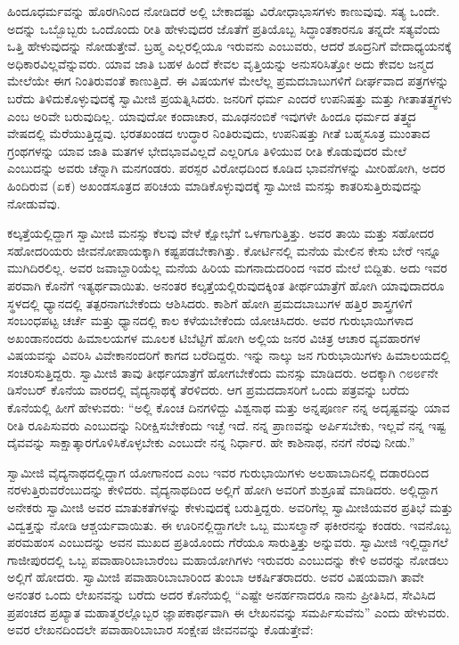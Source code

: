  ಹಿಂದೂಧರ್ಮವನ್ನು ಹೊರಗಿನಿಂದ ನೋಡಿದರೆ ಅಲ್ಲಿ ಬೇಕಾದಷ್ಟು ವಿರೋಧಾಭಾಸಗಳು ಕಾಣುವುವು. ಸತ್ಯ ಒಂದೇ. ಅದನ್ನು ಒಬ್ಬೊಬ್ಬರು ಒಂದೊಂದು ರೀತಿ ಹೇಳುವುದರ ಜೊತೆಗೆ ಪ್ರತಿಯೊಬ್ಬ ಸಿದ್ಧಾಂತಕಾರನೂ ತನ್ನದೇ ಸತ್ಯವೆಂದು ಒತ್ತಿ ಹೇಳುವುದನ್ನು ನೋಡುತ್ತೇವೆ. ಬ್ರಹ್ಮ ಎಲ್ಲರಲ್ಲಿಯೂ ಇರುವನು ಎಂಬುವರು, ಆದರೆ ಶೂದ್ರನಿಗೆ ವೇದಾಧ್ಯಯನಕ್ಕೆ ಅಧಿಕಾರವಿಲ್ಲವೆನ್ನುವರು. ಯಾವ ಜಾತಿ ಬಹಳ ಹಿಂದೆ ಕೇವಲ ವೃತ್ತಿಯನ್ನು ಅನುಸರಿಸಿತ್ತೋ ಅದು ಕೇವಲ ಜನ್ಮದ ಮೇಲೆಯೇ ಈಗ ನಿಂತಿರುವಂತೆ ಕಾಣುತ್ತಿದೆ. ಈ ವಿಷಯಗಳ ಮೇಲೆಲ್ಲ ಪ್ರಮದಬಾಬುಗಳಿಗೆ ದೀರ್ಘವಾದ ಪತ್ರಗಳನ್ನು ಬರೆದು ತಿಳಿದುಕೊಳ್ಳುವುದಕ್ಕೆ ಸ್ವಾಮೀಜಿ ಪ್ರಯತ್ನಿಸಿದರು. ಜನರಿಗೆ ಧರ್ಮ ಎಂದರೆ ಉಪನಿಷತ್ತು ಮತ್ತು ಗೀತಾತತ್ತ್ವಗಳು ಎಂಬ ಅರಿವೇ ಬರುವುದಿಲ್ಲ. ಯಾವುದೋ ಕಂದಾಚಾರ, ಮೂಢನಂಬಿಕೆ ಇವುಗಳೇ ಹಿಂದೂ ಧರ್ಮದ ತತ್ತ್ವದ ವೇಷದಲ್ಲಿ ಮೆರೆಯುತ್ತಿದ್ದವು. ಭರತಖಂಡದ ಉದ್ಧಾರ ನಿಂತಿರುವುದು, ಉಪನಿಷತ್ತು ಗೀತೆ ಬಹ್ಮಸೂತ್ರ ಮುಂತಾದ ಗ್ರಂಥಗಳನ್ನು ಯಾವ ಜಾತಿ ಮತಗಳ ಭೇದಭಾವವಿಲ್ಲದೆ ಎಲ್ಲರಿಗೂ ತಿಳಿಯುವ ರೀತಿ ಕೊಡುವುದರ ಮೇಲೆ ಎಂಬುದನ್ನು ಅವರು ಚೆನ್ನಾಗಿ ಮನಗಂಡರು. ಪರಸ್ಪರ ವಿರೋಧದಿಂದ ಕೂಡಿದ ಭಾವನೆಗಳನ್ನು ಮೀರಿಹೋಗಿ, ಅದರ ಹಿಂದಿರುವ (ಏಕ) ಅಖಂಡಸೂತ್ರದ ಪರಿಚಯ ಮಾಡಿಕೊಳ್ಳುವುದಕ್ಕೆ ಸ್ವಾಮೀಜಿ ಮನಸ್ಸು ಕಾತರಿಸುತ್ತಿರುವುದನ್ನು ನೋಡುವೆವು. 

 ಕಲ್ಕತ್ತೆಯಲ್ಲಿದ್ದಾಗ ಸ್ವಾಮೀಜಿ ಮನಸ್ಸು ಕೆಲವು ವೇಳೆ ಕ್ಷೋಭೆಗೆ ಒಳಗಾಗುತ್ತಿತ್ತು. ಅವರ ತಾಯಿ ಮತ್ತು ಸಹೋದರ ಸಹೋದರಿಯರು ಜೀವನೋಪಾಯಕ್ಕಾಗಿ ಕಷ್ಟಪಡಬೇಕಾಗಿತ್ತು. ಕೋರ್ಟಿನಲ್ಲಿ ಮನೆಯ ಮೇಲಿನ ಕೇಸು ಬೇರೆ ಇನ್ನೂ ಮುಗಿದಿರಲಿಲ್ಲ. ಅವರ ಜವಾಬ್ದಾರಿಯೆಲ್ಲ ಮನೆಯ ಹಿರಿಯ ಮಗನಾದುದರಿಂದ ಇವರ ಮೇಲೆ ಬಿದ್ದಿತು. ಅದು ಇವರ ಪರವಾಗಿ ಕೊನೆಗೆ ಇತ್ಯರ್ಥವಾಯಿತು. ಅನಂತರ ಕಲ್ಕತ್ತೆಯಲ್ಲಿರುವುದಕ್ಕಿಂತ ತೀರ್ಥಯಾತ್ರೆಗೆ ಹೋಗಿ ಯಾವುದಾದರೂ ಸ್ಥಳದಲ್ಲಿ ಧ್ಯಾನದಲ್ಲಿ ತತ್ಪರನಾಗಬೇಕೆಂದು ಆಶಿಸಿದರು. ಕಾಶಿಗೆ ಹೋಗಿ ಪ್ರಮದಬಾಬುಗಳ ಹತ್ತಿರ ಶಾಸ್ತ್ರಗಳಿಗೆ ಸಂಬಂಧಪಟ್ಟ ಚರ್ಚೆ ಮತ್ತು ಧ್ಯಾನದಲ್ಲಿ ಕಾಲ ಕಳೆಯಬೇಕೆಂದು ಯೋಚಿಸಿದರು. ಅವರ ಗುರುಭಾಯಿಗಳಾದ ಅಖಂಡಾನಂದರು ಹಿಮಾಲಯಗಳ ಮೂಲಕ ಟಿಬೆಟ್ಟಿಗೆ ಹೋಗಿ ಅಲ್ಲಿಯ ಜನರ ವಿಚಿತ್ರ ಆಚಾರ ವ್ಯವಹಾರಗಳ ವಿಷಯವನ್ನು ವಿವರಿಸಿ ವಿವೇಕಾನಂದರಿಗೆ ಕಾಗದ ಬರೆದಿದ್ದರು. ಇನ್ನು ನಾಲ್ಕು ಜನ ಗುರುಭಾಯಿಗಳು ಹಿಮಾಲಯದಲ್ಲಿ ಸಂಚರಿಸುತ್ತಿದ್ದರು. ಸ್ವಾಮೀಜಿ ತಾವು ತೀರ್ಥಯಾತ್ರೆಗೆ ಹೋಗಬೇಕೆಂದು ಮನಸ್ಸು ಮಾಡಿದರು. ಅದಕ್ಕಾಗಿ ೧೮೮೯ನೇ ಡಿಸೆಂಬರ್ ಕೊನೆಯ ವಾರದಲ್ಲಿ ವೈದ್ಯನಾಥಕ್ಕೆ ತೆರಳಿದರು. ಆಗ ಪ್ರಮದದಾಸರಿಗೆ ಒಂದು ಪತ್ರವನ್ನು ಬರೆದು ಕೊನೆಯಲ್ಲಿ ಹೀಗೆ ಹೇಳುವರು: “ಅಲ್ಲಿ ಕೊಂಚ ದಿನಗಳಿದ್ದು ವಿಶ್ವನಾಥ ಮತ್ತು ಅನ್ನಪೂರ್ಣ ನನ್ನ ಅದೃಷ್ಟವನ್ನು ಯಾವ ರೀತಿ ರೂಪಿಸುವರು ಎಂಬುದನ್ನು ನಿರೀಕ್ಷಿಸಬೇಕೆಂದು ಇಚ್ಛೆ ಇದೆ. ನನ್ನ ಪ್ರಾಣವನ್ನು ಅರ್ಪಿಸಬೇಕು, ಇಲ್ಲವೆ ನನ್ನ ಇಷ್ಟ ದೈವವನ್ನು ಸಾಕ್ಷಾತ್ಕಾರಗೊಳಿಸಿಕೊಳ್ಳಬೇಕು ಎಂಬುದೇ ನನ್ನ ನಿರ್ಧಾರ. ಹೇ ಕಾಶಿನಾಥ, ನನಗೆ ನೆರವು ನೀಡು.” 

 ಸ್ವಾಮೀಜಿ ವೈದ್ಯನಾಥದಲ್ಲಿದ್ದಾಗ ಯೋಗಾನಂದ ಎಂಬ ಇವರ ಗುರುಭಾಯಿಗಳು ಅಲಹಾಬಾದಿನಲ್ಲಿ ದಡಾರದಿಂದ ನರಳುತ್ತಿರುವರೆಂಬುದನ್ನು ಕೇಳಿದರು. ವೈದ್ಯನಾಥದಿಂದ ಅಲ್ಲಿಗೆ ಹೋಗಿ ಅವರಿಗೆ ಶುಶ್ರೂಷೆ ಮಾಡಿದರು. ಅಲ್ಲಿದ್ದಾಗ ಅನೇಕರು ಸ್ವಾಮೀಜಿ ಅವರ ಮಾತುಕತೆಗಳನ್ನು ಕೇಳುವುದಕ್ಕೆ ಬರುತ್ತಿದ್ದರು. ಅವರಿಗೆಲ್ಲ ಸ್ವಾಮೀಜಿಯವರ ಪ್ರತಿಭೆ ಮತ್ತು ವಿದ್ವತ್ತನ್ನು ನೋಡಿ ಆಶ್ಚರ್ಯವಾಯಿತು. ಈ ಊರಿನಲ್ಲಿದ್ದಾಗಲೇ ಒಬ್ಬ ಮುಸಲ್ಮಾನ್ ಫಕೀರನನ್ನು ಕಂಡರು. ಇವನೊಬ್ಬ ಪರಮಹಂಸ ಎಂಬುದನ್ನು ಅವನ ಮುಖದ ಪ್ರತಿಯೊಂದು ಗೆರೆಯೂ ಸಾರುತ್ತಿತ್ತು ಅನ್ನುವರು. ಸ್ವಾಮೀಜಿ ಇಲ್ಲಿದ್ದಾಗಲೆ ಗಾಜೀಪುರದಲ್ಲಿ ಒಬ್ಬ ಪವಾಹಾರಿಬಾಬಾರೆಂಬ ಮಹಾಯೋಗಿಗಳು ಇರುವರು ಎಂಬುದನ್ನು ಕೇಳಿ ಅವರನ್ನು ನೋಡಲು ಅಲ್ಲಿಗೆ ಹೋದರು. ಸ್ವಾಮೀಜಿ ಪವಾಹಾರಿಬಾಬಾರಿಂದ ತುಂಬಾ ಆಕರ್ಷಿತರಾದರು. ಅವರ ವಿಷಯವಾಗಿ ತಾವೇ ಅನಂತರ ಒಂದು ಲೇಖನವನ್ನು ಬರೆದು ಅದರ ಕೊನೆಯಲ್ಲಿ “ಎಷ್ಟೇ ಅನರ್ಹನಾದರೂ ನಾನು ಪ್ರೀತಿಸಿದ, ಸೇವಿಸಿದ ಪ್ರಪಂಚದ ಪ್ರಖ್ಯಾತ ಮಹಾತ್ಮರಲ್ಲೊಬ್ಬರ ಜ್ಞಾಪಕಾರ್ಥವಾಗಿ ಈ ಲೇಖನವನ್ನು ಸಮರ್ಪಿಸುವೆನು” ಎಂದು ಹೇಳುವರು. ಅವರ ಲೇಖನದಿಂದಲೇ ಪವಾಹಾರಿಬಾಬಾರ ಸಂಕ್ಷೇಪ ಜೀವನವನ್ನು ಕೊಡುತ್ತೇವೆ: 

